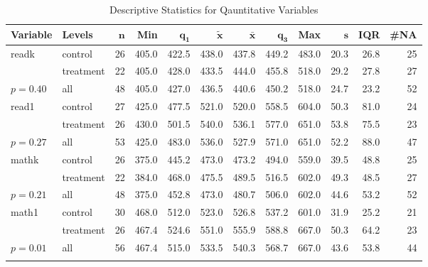 \documentclass{article}\usepackage[]{graphicx}\usepackage[]{color}
\begin{document}
\begin{landscape}
\clearpage
{\footnotesize
\begin{longtable}{llrrrrrrrrrr}
 \textbf{Variable} & \textbf{Levels} & $\mathbf{n}$ & \textbf{Min} & $\mathbf{q_1}$ & $\mathbf{\widetilde{x}}$ & $\mathbf{\bar{x}}$ & $\mathbf{q_3}$ & \textbf{Max} & $\mathbf{s}$ & \textbf{IQR} & \textbf{\#NA} \\ 
  \hline
readk & control & 26 & 405.0 & 422.5 & 438.0 & 437.8 & 449.2 & 483.0 & 20.3 & 26.8 & 25 \\ 
   & treatment & 22 & 405.0 & 428.0 & 433.5 & 444.0 & 455.8 & 518.0 & 29.2 & 27.8 & 27 \\ 
   \hline
$p= 0.40$ & all & 48 & 405.0 & 427.0 & 436.5 & 440.6 & 450.2 & 518.0 & 24.7 & 23.2 & 52 \\ 
   \hline
read1 & control & 27 & 425.0 & 477.5 & 521.0 & 520.0 & 558.5 & 604.0 & 50.3 & 81.0 & 24 \\ 
   & treatment & 26 & 430.0 & 501.5 & 540.0 & 536.1 & 577.0 & 651.0 & 53.8 & 75.5 & 23 \\ 
   \hline
$p= 0.27$ & all & 53 & 425.0 & 483.0 & 536.0 & 527.9 & 571.0 & 651.0 & 52.2 & 88.0 & 47 \\ 
   \hline
mathk & control & 26 & 375.0 & 445.2 & 473.0 & 473.2 & 494.0 & 559.0 & 39.5 & 48.8 & 25 \\ 
   & treatment & 22 & 384.0 & 468.0 & 475.5 & 489.5 & 516.5 & 602.0 & 49.3 & 48.5 & 27 \\ 
   \hline
$p= 0.21$ & all & 48 & 375.0 & 452.8 & 473.0 & 480.7 & 506.0 & 602.0 & 44.6 & 53.2 & 52 \\ 
   \hline
math1 & control & 30 & 468.0 & 512.0 & 523.0 & 526.8 & 537.2 & 601.0 & 31.9 & 25.2 & 21 \\ 
   & treatment & 26 & 467.4 & 524.6 & 551.0 & 555.9 & 588.8 & 667.0 & 50.3 & 64.2 & 23 \\ 
   \hline
$p= 0.01$ & all & 56 & 467.4 & 515.0 & 533.5 & 540.3 & 568.7 & 667.0 & 43.6 & 53.8 & 44 \\ 
   \hline
\hline
\caption{Descriptive Statistics for Qauntitative Variables} 
\label{}
\end{longtable}
}


\end{landscape}
\clearpage
\end{document}
